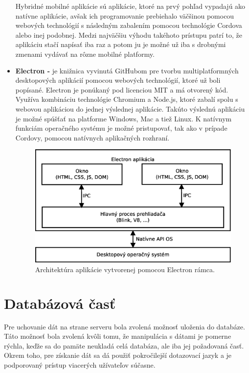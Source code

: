 \begin{itemize}
    Hybridné mobilné aplikácie sú aplikácie, ktoré na prvý pohľad vypadajú ako natívne aplikácie, avšak ich programovanie prebiehalo väčšinou pomocou webových technológií s následným zabalením pomocou technológie Cordova alebo inej podobnej. Medzi  najväčšiu výhodu takéhoto prístupu patrí to, že aplikáciu stačí napísať iba raz a potom ju je možné už iba s drobnými zmenami vydávať na rôzne mobilné platformy.\cite{0QSW9GoG0OTJ7FKM}
    \item \textbf{Electron -} je knižnica vyvinutá GitHubom pre tvorbu multiplatformných desktopových aplikácií pomocou webových technológií, ktoré už boli popísané. Electron je ponúkaný pod licenciou MIT a má otvorený kód. Využíva kombináciu technológie Chromium a Node.js, ktoré zabalí spolu s webovou aplikáciou do jednej výslednej aplikácie. Takúto výslednú aplikáciu je možné spúšťať na platforme Windows, Mac a tiež Linux. K natívnym funkciám operačného systému je možné pristupovať, tak ako v prípade Cordovy, pomocou natívnych aplikačných rozhraní. \cite{hBGbGXxiU66nJt51}
    \begin{figure}[h]
      \centering
      \includegraphics[scale=0.40]{fig/electron.eps}
      \caption{Architektúra aplikácie vytvorenej pomocou Electron rámca.}
      \label{fig:electron}
    \end{figure}
\end{itemize}

\section{Databázová časť}
Pre uchovanie dát na strane serveru bola zvolená možnosť uloženia do databáze. Táto možnosť bola zvolená kvôli tomu, že manipulácia s dátami je pomerne rýchla, keďže sa do pamäte neukladá celá databáza, ale iba jej požadovaná časť. Okrem toho, pre získanie dát sa dá použiť pokročilejší dotazovací jazyk a je podporovaný prístup viacerých užívateľov súčasne. 

